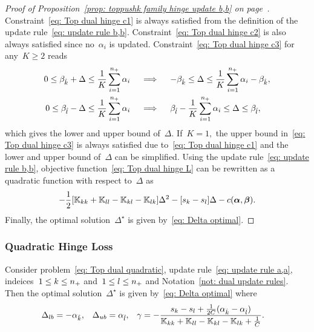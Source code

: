 \toprulebb*
\begin{proof}[Proof of Proposition~\ref{prop: toppushk family hinge update b,b} on page~\pageref{prop: toppushk family hinge update b,b}]
  Constraint~\eqref{eq: Top dual hinge c1} is always satisfied from the definition of the update rule~\eqref{eq: update rule b,b}. Constraint~\eqref{eq: Top dual hinge c2} is also always satisfied since no~$\alpha_i$ is updated. Constraint~\eqref{eq: Top dual hinge c3} for any~$K \geq 2$ reads
  \begin{align*}
    0 \leq \beta_{\hat{k}} + \Delta \leq \frac{1}{K} \sum_{i = 1}^{n_{+}} \alpha_i 
    & \quad \implies \quad
    -\beta_{\hat{k}} \leq \Delta \leq \frac{1}{K} \sum_{i = 1}^{n_{+}} \alpha_i - \beta_{\hat{k}}, \\
    0 \leq \beta_{\hat{l}} - \Delta \leq \frac{1}{K} \sum_{i = 1}^{n_{+}} \alpha_i
    & \quad \implies \quad
    \beta_{\hat{l}} - \frac{1}{K} \sum_{i = 1}^{n_{+}} \alpha_i \leq \Delta \leq \beta_{\hat{l}},
  \end{align*}
  which gives the lower and upper bound of~$\Delta.$ If~$K = 1,$ the upper bound in~\eqref{eq: Top dual hinge c3} is always satisfied due to~\eqref{eq: Top dual hinge c1} and the lower and upper bound of~$\Delta$ can be simplified. Using the update rule~\eqref{eq: update rule b,b}, objective function~\eqref{eq: Top dual hinge L} can be rewritten as a quadratic function with respect to~$\Delta$ as
  \begin{equation*}
    - \frac{1}{2} \Brac[s]{\K_{kk} + \K_{ll} - \K_{kl} - \K_{lk}} \Delta^2
    - \Brac[s]{s_k - s_l} \Delta
    - c(\bm{\alpha}, \bm{\beta}).
  \end{equation*}
  Finally, the optimal solution~$\Delta^{\star}$ is given by~\eqref{eq: Delta optimal}.
\end{proof}

\pagebreak

\subsubsection{Quadratic Hinge Loss}

\begin{proposition}\label{prop: toppushk family quadratic update a,a}
  Consider problem~\eqref{eq: Top dual quadratic}, update rule~\eqref{eq: update rule a,a}, indeices~$1 \leq k \leq n_{+}$ and~$1 \leq l \leq n_{+}$ and Notation~\ref{not: dual update rules}. Then the optimal solution~$\Delta^{\star}$ is given by~\eqref{eq: Delta optimal} where
  \begin{align*}
    \Delta_{lb} & = -\alpha_{\hat{k}}, &
    \Delta_{ub} & = \alpha_{\hat{l}}, &
    \gamma & = -\frac{s_k - s_l + \frac{1}{2C}(\alpha_{\hat{k}} - \alpha_{\hat{l}})}{\mathbb{K}_{kk} + \mathbb{K}_{ll} - \mathbb{K}_{kl} - \mathbb{K}_{lk} + \frac{1}{C}}.
  \end{align*}
\end{proposition}

